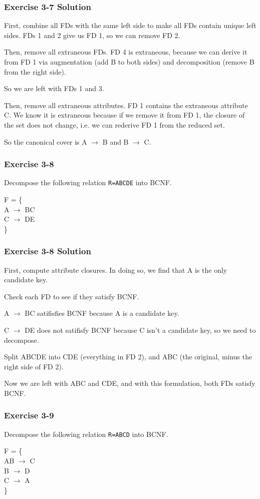 \begin{frame}
\frametitle{Exercise 3-7 Solution}

First, combine all FDs with the same left side to make all FDs contain unique left sides. FDs 1 and 2 give us FD 1, so we can remove FD 2.

Then, remove all extraneous FDs. FD 4 is extraneous, because we can derive it from FD 1 via augmentation (add B to both sides) and decomposition (remove B from the right side).

So we are left with FDs 1 and 3.

Then, remove all extraneous attributes. FD 1 contains the extraneous attribute C. We know it is extraneous because if we remove it from FD 1, the closure of the set does not change, i.e. we can rederive FD 1 from the reduced set.

So the canonical cover is A $\rightarrow$ B and B $\rightarrow$ C.

\end{frame}


\begin{frame}
\frametitle{Exercise 3-8}

Decompose the following relation \texttt{R=ABCDE} into BCNF.

F = \{ \\
  A $\rightarrow$ BC\\
  C $\rightarrow$ DE\\
\}

\end{frame}


\begin{frame}
\frametitle{Exercise 3-8 Solution}

First, compute attribute closures. In doing so, we find that A is the only candidate key.

Check each FD to see if they satisfy BCNF.

A $\rightarrow$ BC satifisfies BCNF because A is a candidate key.

C $\rightarrow$ DE does not satifisfy BCNF because C isn't a candidate key, so we need to decompose.

Split ABCDE into CDE (everything in FD 2), and ABC (the original, minus the right side of FD 2).

Now we are left with ABC and CDE, and with this formulation, both FDs satisfy BCNF.

\end{frame}


\begin{frame}
\frametitle{Exercise 3-9}

Decompose the following relation \texttt{R=ABCD} into BCNF.

F = \{ \\
  AB $\rightarrow$ C\\
  B $\rightarrow$ D\\
  C $\rightarrow$ A\\
\}

\end{frame}


